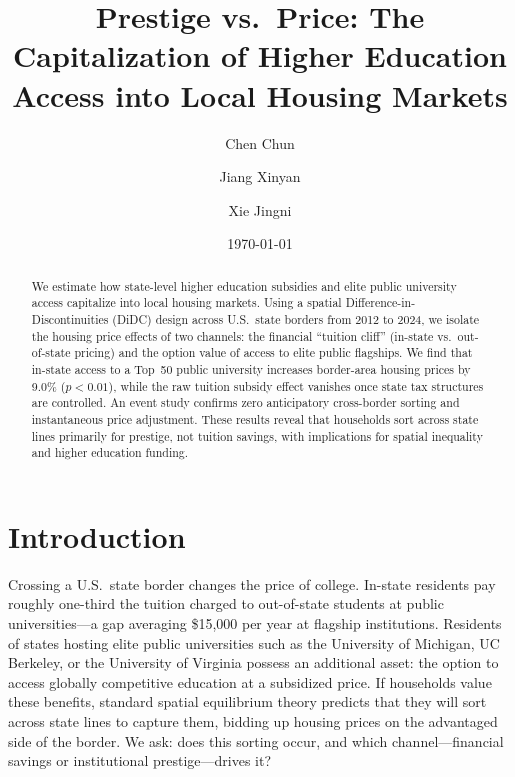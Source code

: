 \documentclass[12pt]{article}
\title{Prestige vs.\ Price: The Capitalization of Higher Education Access into Local Housing Markets}
\author{Chen Chun \and Jiang Xinyan \and Xie Jingni}
\date{\today}
\begin{document}
\maketitle

\begin{abstract}
\noindent
We estimate how state-level higher education subsidies and elite public university access capitalize into local housing markets. Using a spatial Difference-in-Discontinuities (DiDC) design across U.S.\ state borders from 2012 to 2024, we isolate the housing price effects of two channels: the financial ``tuition cliff'' (in-state vs.\ out-of-state pricing) and the option value of access to elite public flagships. We find that in-state access to a Top~50 public university increases border-area housing prices by 9.0\% ($p < 0.01$), while the raw tuition subsidy effect vanishes once state tax structures are controlled. An event study confirms zero anticipatory cross-border sorting and instantaneous price adjustment. These results reveal that households sort across state lines primarily for prestige, not tuition savings, with implications for spatial inequality and higher education funding.
\end{abstract}

\newpage

\section{Introduction}

Crossing a U.S.\ state border changes the price of college. In-state residents pay roughly one-third the tuition charged to out-of-state students at public universities---a gap averaging \$15,000 per year at flagship institutions. Residents of states hosting elite public universities such as the University of Michigan, UC Berkeley, or the University of Virginia possess an additional asset: the option to access globally competitive education at a subsidized price. If households value these benefits, standard spatial equilibrium theory predicts that they will sort across state lines to capture them, bidding up housing prices on the advantaged side of the border. We ask: does this sorting occur, and which channel---financial savings or institutional prestige---drives it?
\end{document}
